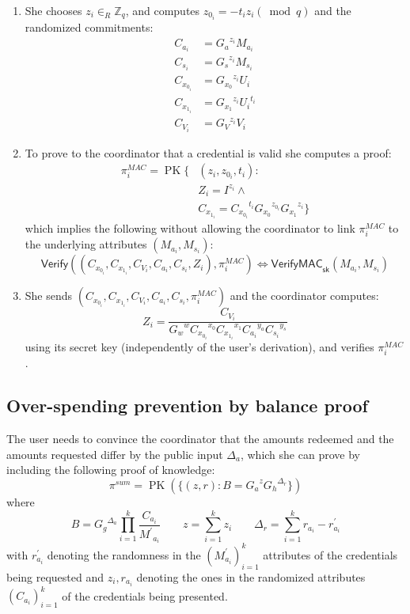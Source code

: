 \documentclass{article}
\begin{document}
\begin{enumerate}

\item She chooses
$z_i \in_{R} \mathbb{Z}_{q}$, and computes
$z_{0_i}=-{t_i} {z_i} (\bmod q)$
and the randomized commitments:
\begin{align*}
C_{a_i}     &= {G_a}^{z_i} M_{a_i} \\
C_{s_i}     &= {G_s}^{z_i} M_{s_i} \\
C_{x_{0_i}} &= {G_{x_0}}^{z_i} {U_i} \\
C_{x_{1_i}} &= {G_{x_1}}^{z_i} {U_i}^{t_i} \\
C_{V_i}     &= {G_V}^{z_i} V_i
\end{align*}

\item To prove to the coordinator that a credential is valid she computes a proof:
\begin{align*}
\pi_{i}^{\mathit{MAC}}=\operatorname{PK}\{
& (z_i, z_{0_i},t_i): \\
& Z_i =I^{z_i} \land \\
& C_{x_{1_i}} = {C_{x_{0_i}}}^{t_i} {G_{x_0}}^{z_{0_i}} {G_{x_1}}^{z_i} \}
\end{align*}
which implies the following without allowing the coordinator to link $\pi_{i}^\mathit{MAC}$ to the underlying attributes $(M_{a_i}, M_{s_i})$:
\[
\mathsf{Verify}((C_{x_{0_i}}, C_{x_{1_i}}, C_{V_i}, C_{a_i}, C_{s_i}, Z_i), \pi_i^{\mathit{MAC}})
\iff
\mathsf{VerifyMAC}_{\mathsf{sk}}(M_{a_i}, M_{s_i})
\]

\item She sends $(C_{x_{0_i}}, C_{x_{1_i}}, C_{V_i}, C_{a_i}, C_{s_i}, \pi_i^{\mathit{MAC}})$ and the coordinator computes:
\[
Z_i=\frac{C_{V_i}}{{G_w}^w {C_{x_{0_i}}}^{x_0} {C_{x_{1_i}}}^{x_{1}}
{C_{a_i}}^{y_a} {C_{s_i}}^{y_s}
}
\]
using its secret key (independently of the user's derivation), and verifies $\pi_i^{\mathit{MAC}}$.

\end{enumerate}

\subsection{Over-spending prevention by balance proof}\label{balance}

The user needs to convince the coordinator that the amounts redeemed and the amounts requested differ by the public input $\Delta_{a}$, which she can prove by including the following proof of knowledge:
\[
\pi^{\mathit{sum}} = \operatorname{PK}(\{ (z, r) : B = {G_a}^{z} {G_h}^{\Delta_r} \})
\]
where
\[
B = {G_g}^{\Delta_a} \prod_{i=1}^k \frac{C_{a_i}}{{M^\prime}_{a_i}}
\qquad
z = \sum_{i=1}^k z_i
\qquad
\Delta_r = \sum_{i=1}^k r_{a_i} - r^{\prime}_{a_i}
\]
with $r^{\prime}_{a_i}$ denoting the randomness in the $(M^{\prime}_{a_i})_{i=1}^k$ attributes of the credentials being requested and $z_i, r_{a_i}$ denoting the ones in the randomized attributes $(C_{a_i})_{i=1}^k$ of the credentials being presented.
\end{document}
